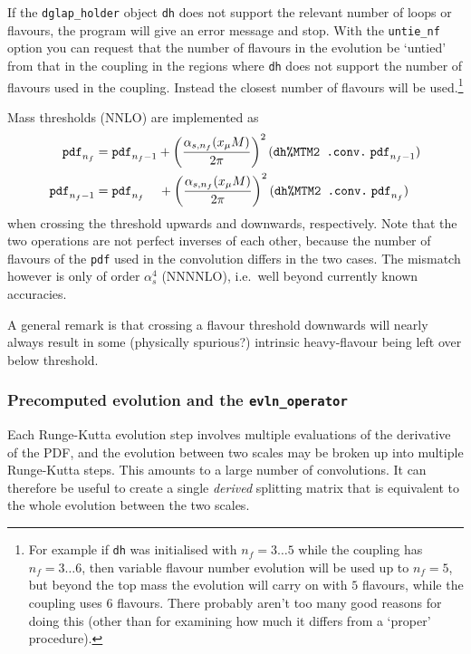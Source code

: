 \documentclass[12pt]{article}
\newcommand{\as}{\alpha_s}
\newcommand{\ie}{i.e.\ }
\newcommand{\ttt}[1]{\texttt{#1}}
\begin{document}
If the \ttt{dglap\_holder} object \ttt{dh} does not support the
relevant number of loops or flavours, the program will give an error
message and stop. With the \ttt{untie\_nf} option you can request that
the number of flavours in the evolution be `untied' from that in the
coupling in the regions where \ttt{dh} does not support the number of
flavours used in the coupling. Instead the closest number of flavours
will be used.\footnote{For example if \ttt{dh} was initialised with
  $n_f = 3\ldots5$ while the coupling has $n_f = 3\ldots 6$, then
  variable flavour number evolution will be used up to $n_f = 5$, but
  beyond the top mass the evolution will carry on with $5$ flavours,
  while the coupling uses $6$ flavours. There probably aren't too many
  good reasons for doing this (other than for examining how much it
  differs from a `proper' procedure).}

Mass thresholds (NNLO) are implemented as
\begin{subequations}
\label{eq:mass_threshold}
\begin{align}
  \ttt{pdf}_{n_f} &= \ttt{pdf}_{n_f-1} +
  \left(\frac{\alpha_{s,n_f}(x_\mu M)}{2\pi}\right)^2
  (\mbox{\ttt{dh\%MTM2 .conv.}}\; \ttt{pdf}_{n_f-1})\\
  \ttt{pdf}_{n_f-1} &= \ttt{pdf}_{n_f} \;\;\;\;+
  \left(\frac{\alpha_{s,n_f}(x_\mu M)}{2\pi}\right)^2
  (\mbox{\ttt{dh\%MTM2 .conv.}}\; \ttt{pdf}_{n_f})
\end{align}
\end{subequations}
when crossing the threshold upwards and downwards, respectively. Note
that the two operations are not perfect inverses of each other,
because the number of flavours of the \ttt{pdf} used in the
convolution differs in the two cases. The mismatch however is only of
order $\as^4$ (NNNNLO), \ie well beyond currently known accuracies.

A general remark is that crossing a flavour threshold downwards will
nearly always result in some (physically spurious?) intrinsic
heavy-flavour being left over below threshold.

\subsubsection{Precomputed evolution and the \ttt{evln\_operator}}
\label{sec:precomputed-evolution}

Each Runge-Kutta evolution step involves multiple evaluations of the
derivative of the PDF, and the evolution between two scales may be
broken up into multiple Runge-Kutta steps. This amounts to a large
number of convolutions. It can therefore be useful to create a single
\emph{derived} splitting matrix that is equivalent to the whole
evolution between the two scales. 
\end{document}
